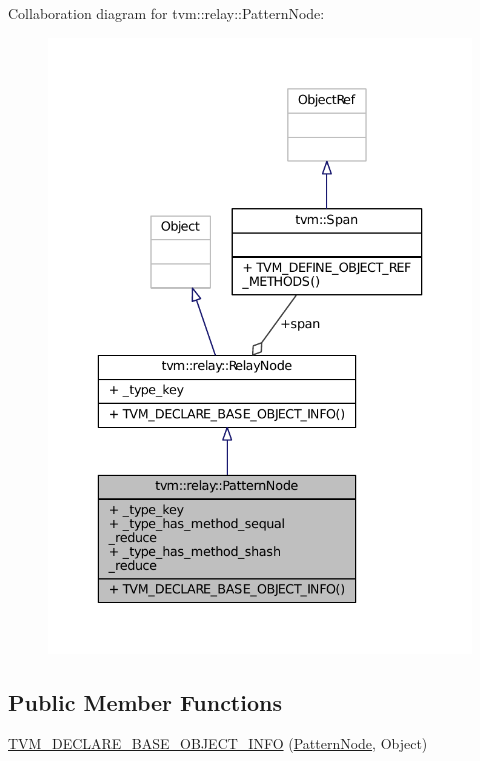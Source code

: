 Collaboration diagram for tvm\+:\+:relay\+:\+:Pattern\+Node\+:
\nopagebreak
\begin{figure}[H]
\begin{center}
\leavevmode
\includegraphics[width=336pt]{classtvm_1_1relay_1_1PatternNode__coll__graph}
\end{center}
\end{figure}
\subsection*{Public Member Functions}
\begin{DoxyCompactItemize}
\item 
\hyperlink{classtvm_1_1relay_1_1PatternNode_afa4d5780f1b010b5fc441e6b7896b469}{T\+V\+M\+\_\+\+D\+E\+C\+L\+A\+R\+E\+\_\+\+B\+A\+S\+E\+\_\+\+O\+B\+J\+E\+C\+T\+\_\+\+I\+N\+FO} (\hyperlink{classtvm_1_1relay_1_1PatternNode}{Pattern\+Node}, Object)
\end{DoxyCompactItemize}
